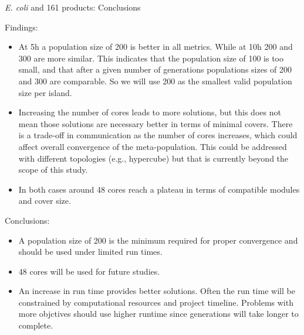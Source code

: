 \documentclass[8pt]{beamer}
\begin{document}
\begin{frame}{\protect\textit{E. coli} and 161 products: Conclusions}

    Findings:
\begin{itemize}
    \item At 5h a population size of 200 is better in all metrics. While at 10h 200 and 300 are more similar. This indicates that the population size of 100 is too small, and that after a given number of generations populations sizes of 200 and 300 are comparable. So we will use 200 as the smallest valid population size per island.
    \item Increasing the number of cores leads to more solutions, but this does not mean those solutions are necessary better in terms of minimal covers. There is a trade-off in communication as the number of cores increases, which could affect overall convergence of the meta-population. This could be addressed with different topologies (e.g., hypercube) but that is currently beyond the scope of this study.
    \item In both cases around 48 cores reach a plateau in terms of compatible modules and cover size.
\end{itemize}


    Conclusions:
\begin{itemize}
    \item A population size of 200 is the minimum required for proper convergence and should be used under limited run times.
    \item 48 cores will be used for future studies.
    \item An increase in run time provides better solutions. Often the run time will be constrained by computational resources and project timeline. Problems with more objctives should use higher runtime since generations will take longer to complete.
\end{itemize}
\end{frame}
\end{document}
